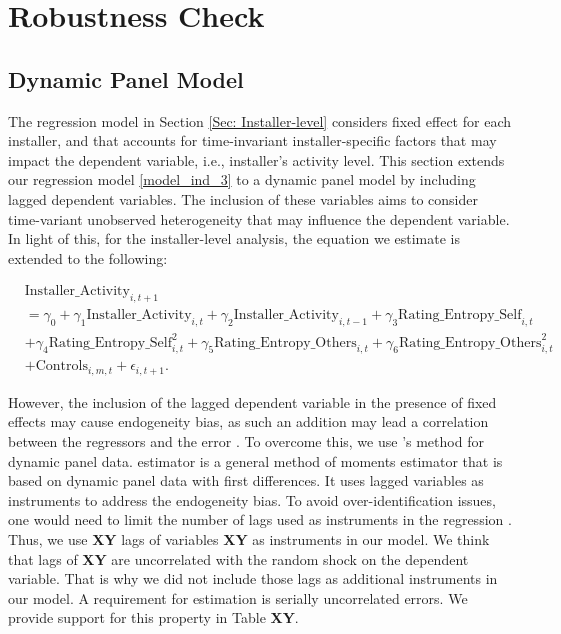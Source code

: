 \documentclass[msom,blindrev]{informs3}
\begin{document}
\section{Robustness Check} \label{Sec: Robustness}

\subsection{Dynamic Panel Model}

The regression model in Section \ref{Sec: Installer-level} considers fixed effect for each installer, and that accounts for time-invariant installer-specific factors that may impact the dependent variable, i.e., installer's activity level. This section extends our regression model  \eqref{model_ind_3} to a dynamic panel model by including lagged dependent variables. The inclusion of these variables aims to consider time-variant unobserved heterogeneity that may influence the dependent variable. In light of this, for the installer-level analysis, the equation we estimate is extended to the following:

\begin{align} \nonumber
&\text{Installer\_Activity}_{i,t+1} \\ \nonumber
 &=\gamma_{0}+\gamma_{1} \text{Installer\_Activity}_{i,t}+ \gamma_{2}\text{Installer\_Activity}_{i,t-1}+
\gamma_{3} \text{Rating\_Entropy\_Self}_{i,t} \\ \nonumber
&+ \gamma_{4} \text{Rating\_Entropy\_Self}_{i,t}^ {2} + \gamma_{5} \text{Rating\_Entropy\_Others}_{i,t}  + \gamma_{6} \text{Rating\_Entropy\_Others}_{i,t}^{2} \\ \label{eq: extended_ind}
&+ \text{Controls}_{i,m,t}+ \epsilon_{i,t+1}.
\end{align}

However,  the inclusion of the lagged dependent variable in the presence of fixed effects may cause endogeneity bias, as such an addition may lead a correlation between the regressors and the error \citep{nickell1981biases}. To overcome this, we use \cite{arellano1991some}'s method for dynamic panel data. \cite{arellano1991some} estimator is a general method of moments estimator that is based on dynamic panel data with first differences. It uses lagged variables as instruments to address the endogeneity bias. To avoid over-identification issues, one would need to limit the number of lags used as instruments in the regression \citep{bowsher2002testing}. Thus, we use \textbf{XY} lags of variables \textbf{XY}  as instruments in our model. We think that lags of \textbf{XY} are uncorrelated with the random shock on the dependent variable. That is why we did not include those lags as additional instruments in our model. A requirement for \cite{arellano1991some} estimation is serially uncorrelated errors. We provide support for this property in Table \textbf{XY}.
\end{document}

